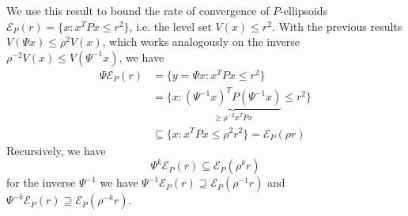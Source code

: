 We use this result to bound the rate of convergence of $P$-ellipsoids $\mathcal E_P(r) = \{x:x^TPx\leq r^2\}$, i.e. 
the level set $V(x)\leq r^2$.
%
With the previous results $V(\Psi x)\leq \rho^2 V(x)$, which works analogously on the inverse 
$\rho^{-2}V(x)\leq V(\Psi^{-1} x)$, we have 
%
\begin{equation}\begin{split}
	\Psi\mathcal E_P(r) &= \{y=\Psi x:x^TPx\leq r^2\}\\
	&=\{x: \underbrace{(\Psi^{-1}x)^TP(\Psi^{-1}x)}_{\geq\rho^{-2} x^TPx}\leq r^2\}\\
	&\subseteq\{x: x^TPx\leq \rho^2 r^2\} = \mathcal E_P(\rho r)
\end{split}
\end{equation}
%
Recursively, we have 
%
\begin{equation}\label{eq:containment:Psik:subset:rhok}
	\Psi^k\mathcal E_P(r)\subseteq \mathcal E_P(\rho^k r)
\end{equation}
%
for the inverse $\Psi^{-1}$ we have $\Psi^{-1}\mathcal E_P(r)\supseteq\mathcal E_P(\rho^{-1}r)$ and 
$\Psi^{-k}\mathcal E_P(r)\supseteq\mathcal E_P(\rho^{-k}r)$.

